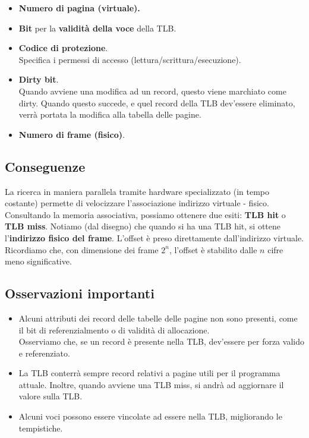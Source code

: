 \documentclass{report}
\begin{document}
\begin{itemize}
    \item \textbf{Numero di pagina (virtuale).}
    \item \textbf{Bit} per la \textbf{validità della voce} della TLB.
    \item \textbf{Codice di protezione}.\\
    Specifica i permessi di accesso (lettura/scrittura/esecuzione).
    \item \textbf{Dirty bit}.\\
    Quando avviene una modifica ad un record, questo viene marchiato come dirty. Quando questo succede, e quel record della TLB dev'essere eliminato, verrà portata la modifica alla tabella delle pagine.
    \item \textbf{Numero di frame (fisico)}.
\end{itemize}

\subsection{Conseguenze}
La ricerca in maniera parallela tramite hardware specializzato (in tempo costante) permette di velocizzare l'associazione indirizzo virtuale - fisico. Consultando la memoria associativa, possiamo ottenere due esiti: \textbf{TLB hit} o \textbf{TLB miss}. Notiamo (dal disegno) che quando si ha una TLB hit, si ottene l'\textbf{indirizzo fisico del frame}. L'offset è preso direttamente dall'indirizzo virtuale. Ricordiamo che, con dimensione dei frame $2^n$, l'offset è stabilito dalle $n$ cifre meno significative.

\subsection{Osservazioni importanti}
\begin{itemize}
    \item Alcuni attributi dei record delle tabelle delle pagine non sono presenti, come il bit di referenzialmento o di validità di allocazione.\\
    Osserviamo che, se un record è presente nella TLB, dev'essere per forza valido e referenziato.

    \item La TLB conterrà sempre record relativi a pagine utili per il programma attuale. Inoltre, quando avviene una TLB miss, si andrà ad aggiornare il valore sulla TLB.

    \item Alcuni voci possono essere vincolate ad essere nella TLB, migliorando le tempistiche.
\end{itemize}
\end{document}

